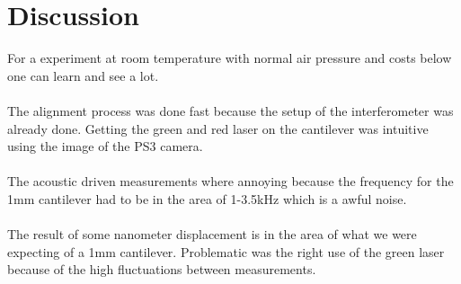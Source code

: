 \documentclass[12pt,a4paper]{article}
\begin{document}
\section{Discussion}
For a experiment at room temperature with normal air pressure and costs below  one can learn and see a lot. \\
\\
The alignment process was done fast because the setup of the interferometer was already done. Getting the green and red laser on the cantilever was intuitive using the image of the PS3 camera. \\
\\
The acoustic driven measurements where annoying because the frequency for the 1mm cantilever had to be in the area of 1-3.5kHz which is a awful noise.\\
\\
The result of some nanometer displacement is in the area of what we were expecting of a 1mm cantilever. Problematic was the right use of the green laser because of the high fluctuations between measurements.\\




\end{document}
